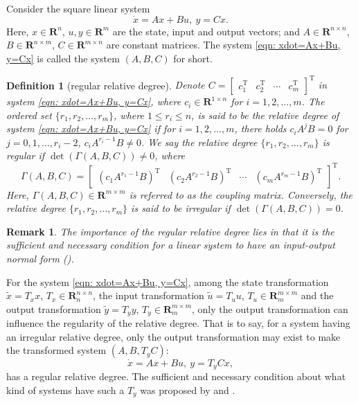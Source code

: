 \documentclass[sort&compress]{elsarticle}
\newtheorem{definition}{Definition}
\newtheorem{remark}{Remark}
\newcommand\GAmma{\mathit\Gamma}
\newcommand\R{\mathbf R}
\newcommand\T{\mathrm T}
\begin{document}
Consider the square linear system
\begin{equation}\label{eqn: xdot=Ax+Bu, y=Cx}
\dot x=Ax+Bu,\ y=Cx.
\end{equation}
Here, $x\in\R^n$, $u,y\in\R^m$ are the state, input and output vectors;
and $A\in\R^{n\times n}$, $B\in\R^{n\times m}$, $C\in\R^{m\times n}$
are constant matrices.
The system \eqref{eqn: xdot=Ax+Bu, y=Cx} is called the system $(A,B,C)$ for short.

\begin{definition}[regular relative degree]\label{def:rd}
Denote $C=\begin{bmatrix}c_1^\T&c_2^\T&\cdots&c_m^\T\end{bmatrix}^\T$
in system \eqref{eqn: xdot=Ax+Bu, y=Cx},
where $c_i\in\R^{1\times n}$ for $i=1,2,\dots,m$.
The ordered set $\{r_1,r_2,\dots,r_m\}$, where $1\le r_i\le n$,
is said to be the relative degree of system
\eqref{eqn: xdot=Ax+Bu, y=Cx} if for $i=1,2,\dots,m$, there holds
$c_iA^jB=0$ for $j=0,1,\dots,r_i-2$, $c_iA^{r_i-1}B\ne0$.
We say the relative degree $\{r_1,r_2,\dots,r_m\}$ is regular if
$\det(\GAmma(A,B,C))\ne0$, where
\[
\GAmma(A,B,C)=
\begin{bmatrix}
(c_1A^{r_1-1}B)^\T&(c_2A^{r_2-1}B)^\T&\cdots&(c_mA^{r_m-1}B)^\T
\end{bmatrix}^\T.
\]
Here, $\GAmma(A,B,C)\in\R^{m\times m}$ is referred to
as the coupling matrix.
Conversely, the relative degree $\{r_1,r_2,\dots,r_m\}$
is said to be irregular if $\det(\GAmma(A,B,C))=0$.
\end{definition}

\begin{remark}
The importance of the regular relative degree lies in that
it is the sufficient and necessary condition for a linear system to
have an input-output normal form (\cite{Zhou2023Auto[J]}).
\end{remark}

For the system \eqref{eqn: xdot=Ax+Bu, y=Cx},
among the state transformation $\tilde x=T_xx$, $T_x\in\R^{n\times n}_n$,
the input transformation $\tilde u=T_uu$, $T_u\in\R^{m\times m}_m$ and
the output transformation $\tilde y=T_yy$, $T_y\in\R^{m\times m}_m$,
only the output transformation can influence
the regularity of the relative degree.
That is to say, for a system having an irregular relative degree,
only the output transformation may exist to make
the transformed system $(A,B,T_yC)$:
\[
\dot x=Ax+Bu,\ y=T_yCx,
\]
has a regular relative degree.
The sufficient and necessary condition about what kind of systems have
such a $T_y$ was proposed by \cite{Zhou2023Auto[J]} and \cite{Cao2025rrdref[J]}.
\end{document}
